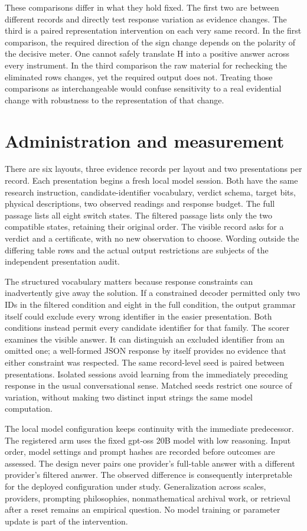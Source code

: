 \documentclass[12pt,letterpaper]{article}
\begin{document}
These comparisons differ in what they hold fixed. The first two are between different records and directly test response variation as evidence changes. The third is a paired representation intervention on each very same record. In the first comparison, the required direction of the sign change depends on the polarity of the decisive meter. One cannot safely translate H into a positive answer across every instrument. In the third comparison the raw material for rechecking the eliminated rows changes, yet the required output does not. Treating those comparisons as interchangeable would confuse sensitivity to a real evidential change with robustness to the representation of that change.

\section{Administration and measurement}

There are six layouts, three evidence records per layout and two presentations per record. Each presentation begins a fresh local model session. Both have the same research instruction, candidate-identifier vocabulary, verdict schema, target bits, physical descriptions, two observed readings and response budget. The full passage lists all eight switch states. The filtered passage lists only the two compatible states, retaining their original order. The visible record asks for a verdict and a certificate, with no new observation to choose. Wording outside the differing table rows and the actual output restrictions are subjects of the independent presentation audit.

The structured vocabulary matters because response constraints can inadvertently give away the solution. If a constrained decoder permitted only two IDs in the filtered condition and eight in the full condition, the output grammar itself could exclude every wrong identifier in the easier presentation. Both conditions instead permit every candidate identifier for that family. The scorer examines the visible answer. It can distinguish an excluded identifier from an omitted one; a well-formed JSON response by itself provides no evidence that either constraint was respected. The same record-level seed is paired between presentations. Isolated sessions avoid learning from the immediately preceding response in the usual conversational sense. Matched seeds restrict one source of variation, without making two distinct input strings the same model computation.

The local model configuration keeps continuity with the immediate predecessor. The registered arm uses the fixed gpt-oss 20B model with low reasoning. Input order, model settings and prompt hashes are recorded before outcomes are assessed. The design never pairs one provider's full-table answer with a different provider's filtered answer. The observed difference is consequently interpretable for the deployed configuration under study. Generalization across scales, providers, prompting philosophies, nonmathematical archival work, or retrieval after a reset remains an empirical question. No model training or parameter update is part of the intervention.
\end{document}
